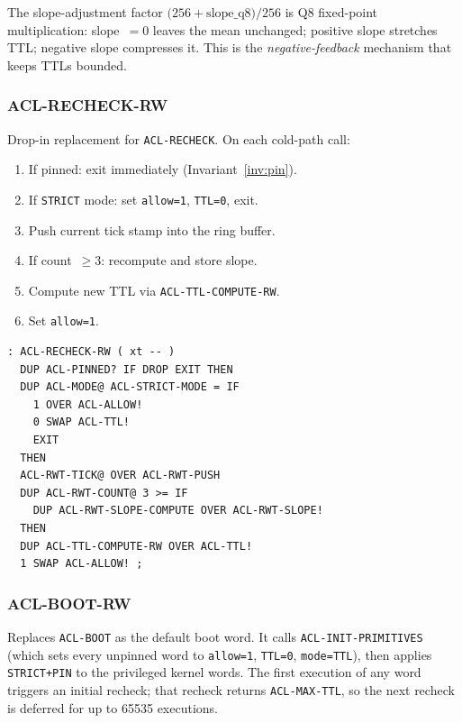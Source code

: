 \documentclass[11pt,letterpaper,openany]{article}
\newcommand{\acl}[1]{\texttt{#1}}
\begin{document}
The slope-adjustment factor $\bigl(256 + \text{slope\_q8}\bigr)/256$ is
Q8 fixed-point multiplication: slope~$=0$ leaves the mean unchanged;
positive slope stretches TTL; negative slope compresses it.  This is
the \emph{negative-feedback} mechanism that keeps TTLs bounded.

\subsubsection*{ACL-RECHECK-RW}

Drop-in replacement for \acl{ACL-RECHECK}.  On each cold-path call:

\begin{enumerate}
  \item If pinned: exit immediately (Invariant~\ref{inv:pin}).
  \item If \texttt{STRICT} mode: set \texttt{allow=1}, \texttt{TTL=0}, exit.
  \item Push current tick stamp into the ring buffer.
  \item If count~$\geq 3$: recompute and store slope.
  \item Compute new TTL via \acl{ACL-TTL-COMPUTE-RW}.
  \item Set \texttt{allow=1}.
\end{enumerate}

\begin{lstlisting}[style=forthstyle,caption={ACL-RECHECK-RW (capsules/ACL.4th, Block 4013)}]
: ACL-RECHECK-RW ( xt -- )
  DUP ACL-PINNED? IF DROP EXIT THEN
  DUP ACL-MODE@ ACL-STRICT-MODE = IF
    1 OVER ACL-ALLOW!
    0 SWAP ACL-TTL!
    EXIT
  THEN
  ACL-RWT-TICK@ OVER ACL-RWT-PUSH
  DUP ACL-RWT-COUNT@ 3 >= IF
    DUP ACL-RWT-SLOPE-COMPUTE OVER ACL-RWT-SLOPE!
  THEN
  DUP ACL-TTL-COMPUTE-RW OVER ACL-TTL!
  1 SWAP ACL-ALLOW! ;
\end{lstlisting}

\subsubsection*{ACL-BOOT-RW}

Replaces \acl{ACL-BOOT} as the default boot word.  It calls
\acl{ACL-INIT-PRIMITIVES} (which sets every unpinned word to
\texttt{allow=1}, \texttt{TTL=0}, \texttt{mode=TTL}), then applies
\texttt{STRICT+PIN} to the privileged kernel words.  The first
execution of any word triggers an initial recheck; that recheck
returns \texttt{ACL-MAX-TTL}, so the next recheck is deferred for up
to 65535 executions.
\end{document}
